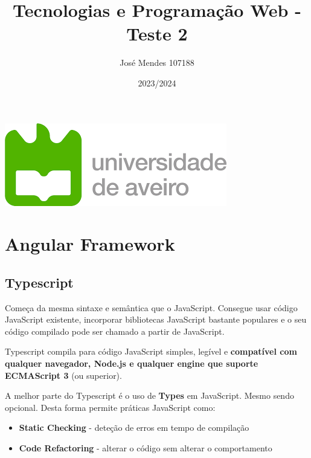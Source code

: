 \documentclass{article}
\title{Tecnologias e Programação Web - Teste 2}
\author{José Mendes 107188}
\date{2023/2024}
\begin{document}
\begin{titlepage}
    \maketitle
    \begin{center}
        \includegraphics[scale=0.4]{UA.png}
    \end{center}
    \thispagestyle{empty} %
\end{titlepage}

\pagebreak

\section{Angular Framework}

\subsection{Typescript}

Começa da mesma sintaxe e semântica que o JavaScript. Consegue usar código JavaScript
existente, incorporar bibliotecas JavaScript bastante populares e o seu código
compilado pode ser chamado a partir de JavaScript.

\vspace{2mm}

Typescript compila para código JavaScript simples, legível e \textbf{compatível com qualquer
navegador, Node.js e qualquer engine que suporte ECMAScript 3} (ou superior).

\vspace{2mm}

A melhor parte do Typescript é o uso de \textbf{Types} em JavaScript.
Mesmo sendo opcional. Desta forma permite práticas JavaScript como:
\begin{itemize}
  \item \textbf{Static Checking} - deteção de erros em tempo de compilação
  \item \textbf{Code Refactoring} - alterar o código sem alterar o comportamento
\end{itemize}
\end{document}
